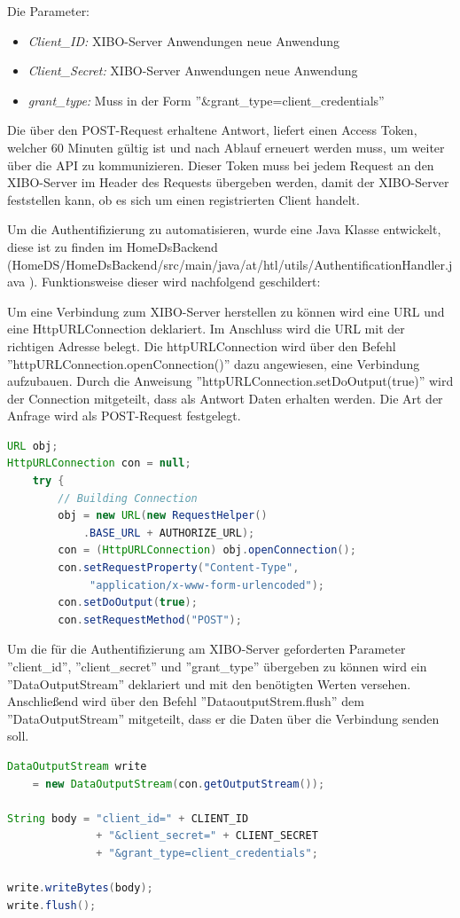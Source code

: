 Die Parameter: 
\begin{itemize}
	\item {\em Client\_ID:} XIBO-Server Anwendungen neue Anwendung
	\item {\em Client\_Secret:}  XIBO-Server Anwendungen neue Anwendung
	\item{\em grant\_type:} Muss in der Form ''&grant\_type=client\_credentials''
\end{itemize}

Die über den POST-Request erhaltene Antwort, liefert einen Access Token, welcher 60 Minuten gültig ist und nach Ablauf erneuert werden muss, um weiter über die API zu kommunizieren.
Dieser Token muss bei jedem Request an den XIBO-Server im Header des Requests übergeben werden, damit der XIBO-Server feststellen kann, ob es sich um einen registrierten Client handelt.


Um die Authentifizierung zu automatisieren, wurde eine Java Klasse entwickelt, diese ist zu finden im HomeDsBackend (HomeDS/HomeDsBackend/src/main/java/at/htl/utils/AuthentificationHandler.java
). Funktionsweise dieser wird nachfolgend geschildert: 

Um eine Verbindung zum XIBO-Server herstellen zu können wird eine URL und eine HttpURLConnection deklariert. Im Anschluss wird die URL mit der richtigen Adresse belegt. Die httpURLConnection wird über den Befehl ''httpURLConnection.openConnection()'' dazu angewiesen, eine Verbindung aufzubauen. Durch die Anweisung ''httpURLConnection.setDoOutput(true)'' wird der Connection mitgeteilt, dass als Antwort Daten erhalten werden. Die Art der Anfrage wird als POST-Request festgelegt. 

\begin{lstlisting}[language=Java,caption={Erstellen der Verbindung zum Server}]
URL obj;
HttpURLConnection con = null;
	try {
    	// Building Connection
        obj = new URL(new RequestHelper()
        	.BASE_URL + AUTHORIZE_URL);
       	con = (HttpURLConnection) obj.openConnection();
        con.setRequestProperty("Content-Type",
             "application/x-www-form-urlencoded");    
        con.setDoOutput(true);
        con.setRequestMethod("POST");
\end{lstlisting}

Um die für die Authentifizierung am XIBO-Server geforderten Parameter ''client\_id'', ''client\_secret'' und ''grant\_type'' übergeben zu können wird ein ''DataOutputStream'' deklariert und mit den benötigten Werten versehen. Anschließend wird über den Befehl  ''DataoutputStrem.flush'' dem ''DataOutputStream'' mitgeteilt, dass er die Daten über die Verbindung senden soll.
\begin{lstlisting}[language=Java,caption={Erstellen und senden des JSON-Body}]
DataOutputStream write 
	= new DataOutputStream(con.getOutputStream());
	 
String body = "client_id=" + CLIENT_ID
              + "&client_secret=" + CLIENT_SECRET
              + "&grant_type=client_credentials";

write.writeBytes(body);
write.flush();
\end{lstlisting}

